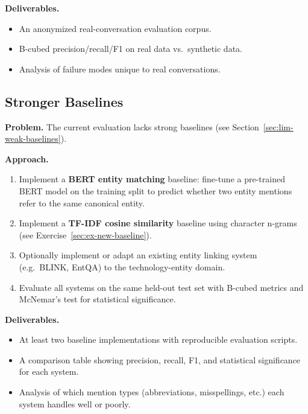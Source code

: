 \medskip\noindent\textbf{Deliverables.}

\begin{itemize}
    \item An anonymized real-conversation evaluation corpus.
    \item B-cubed precision/recall/F1 on real data vs.\ synthetic data.
    \item Analysis of failure modes unique to real conversations.
\end{itemize}


\subsection{Stronger Baselines}
\label{sec:future-baselines}

\noindent\textbf{Problem.}
The current evaluation lacks strong baselines (see
Section~\ref{sec:lim-weak-baselines}).

\medskip\noindent\textbf{Approach.}

\begin{enumerate}
    \item Implement a \textbf{BERT entity matching} baseline: fine-tune a
          pre-trained BERT model on the training split to predict whether
          two entity mentions refer to the same canonical entity.
    \item Implement a \textbf{TF-IDF cosine similarity} baseline using
          character n-grams (see Exercise~\ref{sec:ex-new-baseline}).
    \item Optionally implement or adapt an existing entity linking system
          (e.g.\ BLINK, EntQA) to the technology-entity domain.
    \item Evaluate all systems on the same held-out test set with B-cubed
          metrics and McNemar's test for statistical significance.
\end{enumerate}

\medskip\noindent\textbf{Deliverables.}

\begin{itemize}
    \item At least two baseline implementations with reproducible
          evaluation scripts.
    \item A comparison table showing precision, recall, F1, and
          statistical significance for each system.
    \item Analysis of which mention types (abbreviations, misspellings,
          etc.) each system handles well or poorly.
\end{itemize}



